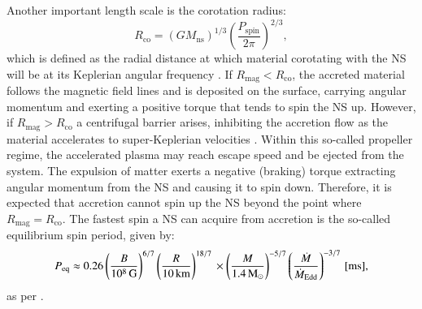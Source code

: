 \documentclass[main.tex]{subfiles}
\begin{document}
        Another important length scale is the corotation radius:
        \begin{equation}
            \label{eq:rcor}
            R_\mathrm{co} = (G M_\mathrm{ns})^{1/3}\left(\frac{P_\mathrm{spin}}{2\pi}\right)^{2/3},
        \end{equation}
        which is defined as the radial distance at which material corotating with the NS will be at its Keplerian angular 
        frequency \citep[e.g.,][]{1996ApJ...457L..31C, 2017ApJ...835....4B, Bhattacharyya:mdpi23}. If $R_\mathrm{mag} < 
        R_\mathrm{co}$, the accreted material follows the magnetic field lines and is deposited on the surface, carrying angular 
        momentum and exerting a positive torque that tends to spin the NS up. However, if $R_\mathrm{mag} > R_\mathrm{co}$ 
        a centrifugal barrier arises, inhibiting the accretion flow as the material accelerates to super-Keplerian velocities 
        \citep[e.g.,][and references therein]{2017ApJ...835....4B, Bhattacharyya:mdpi23}. Within this so-called propeller regime, the 
        accelerated plasma may reach escape speed and be ejected from the system. The expulsion of matter exerts a negative (braking) 
        torque extracting angular momentum from the NS and causing it to spin down. Therefore, it is expected that 
        accretion cannot spin up the NS beyond the point where $R_\mathrm{mag} = R_\mathrm{co}$. The fastest spin a NS can acquire from accretion is the so-called equilibrium spin period, given by:
        \begin{equation}
            \label{eq:p_eq}
            P_\mathrm{eq} \approx 0.26 \left(\frac{B}{10^8\,\mathrm{G}}\right)^{6/7} \left(\frac{R}{10\,\mathrm{km}}\right)^{18/7} \\ \times \left(\frac{M}{1.4\mathrm{\,M_\odot}}\right)^{-5/7} \left(\frac{\dot{M}}{\dot{M}_\mathrm{Edd}}\right)^{-3/7}\,\mathrm{[ms],}
        \end{equation}
        as per \citet{10.1111/j.1365-2966.2005.09167.x}.
        
\end{document}
